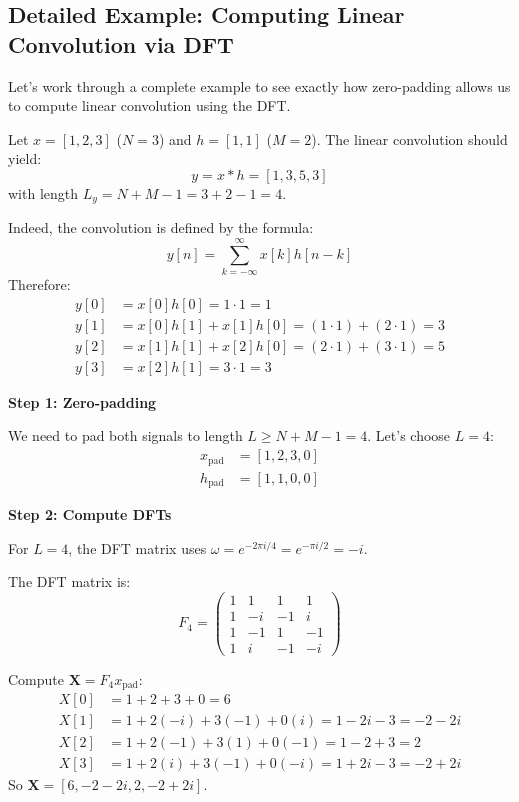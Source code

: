 \begin{notechapter}
\subsection{Detailed Example: Computing Linear Convolution via DFT}

Let's work through a complete example to see exactly how zero-padding allows us to compute 
linear convolution using the DFT.

\begin{example}
Let $x = [1, 2, 3]$ ($N=3$) and $h = [1, 1]$ ($M=2$). The linear convolution should yield:
\[
y = x * h = [1, 3, 5, 3]
\]
with length $L_y = N + M - 1 = 3 + 2 - 1 = 4$.

Indeed, the convolution is defined by the formula:
\[
y[n] = \sum_{k=-\infty}^{\infty} x[k]h[n-k]
\]
Therefore:
\begin{align*}
    y[0] &= x[0]h[0] = 1 \cdot 1 = 1 \\
    y[1] &= x[0]h[1] + x[1]h[0] = (1 \cdot 1) + (2 \cdot 1) = 3 \\
    y[2] &= x[1]h[1] + x[2]h[0] = (2 \cdot 1) + (3 \cdot 1) = 5 \\
    y[3] &= x[2]h[1] = 3 \cdot 1 = 3
\end{align*}


\vspace{0.3cm}
\textbf{Step 1: Zero-padding}

We need to pad both signals to length $L \geq N + M - 1 = 4$. Let's choose $L = 4$:
\begin{align*}
x_{\text{pad}} &= [1, 2, 3, 0] \\
h_{\text{pad}} &= [1, 1, 0, 0]
\end{align*}

\vspace{0.3cm}
\textbf{Step 2: Compute DFTs}

For $L=4$, the DFT matrix uses $\omega = e^{-2\pi i/4} = e^{-\pi i/2} = -i$.

The DFT matrix is:
\[
F_4 = \begin{pmatrix}
1 & 1 & 1 & 1 \\
1 & -i & -1 & i \\
1 & -1 & 1 & -1 \\
1 & i & -1 & -i
\end{pmatrix}
\]

Compute $\mathbf{X} = F_4 x_{\text{pad}}$:
\begin{align*}
X[0] &= 1 + 2 + 3 + 0 = 6 \\
X[1] &= 1 + 2(-i) + 3(-1) + 0(i) = 1 - 2i - 3 = -2 - 2i \\
X[2] &= 1 + 2(-1) + 3(1) + 0(-1) = 1 - 2 + 3 = 2 \\
X[3] &= 1 + 2(i) + 3(-1) + 0(-i) = 1 + 2i - 3 = -2 + 2i
\end{align*}
So $\mathbf{X} = [6, -2-2i, 2, -2+2i]$.


\end{example}
\end{notechapter}
